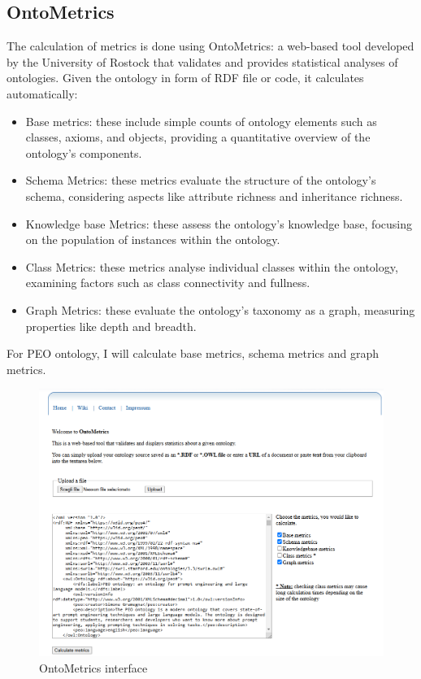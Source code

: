 \subsection{OntoMetrics}
The calculation of metrics is done using OntoMetrics: a web-based tool developed by the University of Rostock that validates and provides statistical analyses of ontologies.\cite{lantow2016ontometrics}
Given the ontology in form of RDF file or code, it calculates automatically:
\begin{itemize}
    \item Base metrics: these include simple counts of ontology elements such as classes, axioms, and objects, providing a quantitative overview of the ontology's components.

    \item Schema Metrics: these metrics evaluate the structure of the ontology's schema, considering aspects like attribute richness and inheritance richness.

    \item Knowledge base Metrics: these assess the ontology's knowledge base, focusing on the population of instances within the ontology.

    \item Class Metrics: these metrics analyse individual classes within the ontology, examining factors such as class connectivity and fullness.

    \item Graph Metrics: these evaluate the ontology's taxonomy as a graph, measuring properties like depth and breadth.
\end{itemize}
For PEO ontology, I will calculate base metrics, schema metrics and graph metrics.
\begin{figure}[H]
    \centering
    \includegraphics[width=0.9\linewidth]{Figures/fig_41.png}
    \caption{OntoMetrics interface}
    \label{fig:enter-label}
\end{figure}

